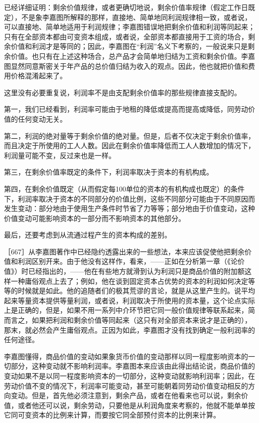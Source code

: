 

已经详细证明：剩余价值规律，或者更确切地说，剩余价值率规律（假定工作日既定），不是象李嘉图所解释的那样，直接地、简单地同利润规律相一致，或者说，可以直接地、简单地适用于利润规律；李嘉图错误地把剩余价值和利润等同起来；只有在全部资本都由可变资本组成，或者说，全部资本都直接用于工资的场合，剩余价值和利润才是等同的；因此，李嘉图在“利润”名义下考察的，一般说来只是剩余价值。也只有在上述这种场合，总产品才会简单地归结为工资和剩余价值。李嘉图显然同意斯密关于年产品的总价值归结为收入的观点。因此，他也就把价值和费用价格混淆起来了。

这里没有必要重复说，利润率不是由支配剩余价值率的那些规律直接支配的。

第一，我们已经看到，利润率可能由于地租的降低或提高而提高或降低，同劳动价值的任何变动无关。

第二，利润的绝对量等于剩余价值的绝对量。但是，后者不仅决定于剩余价值率，而且决定于所使用的工人人数。因此在剩余价值率降低而工人人数增加的情况下，利润量可能不变，反过来也是一样。

第三，在剩余价值率既定的条件下，利润率取决于资本的有机构成。

第四，在剩余价值既定（从而假定每100单位的资本的有机构成也既定）的条件下，利润率取决于资本的不同部分的价值比例，这些不同部分可能由于不同原因而发生变动：部分地由于使用生产条件时节省了力等等；部分地由于价值变动，这种价值变动可能影响资本的一部分而不影响资本的其他部分。

最后，还要考虑到从流通过程产生的资本构成的差别。

［667］从李嘉图著作中已经隐约透露出来的一些想法，本来应该促使他把剩余价值和利润区别开来。由于他没有这样作，看来，——正如在分析第一章（《论价值》）时已经指出的，——他在有些地方就滑到认为利润只是商品价值的附加额这样一种庸俗观点上去了；例如，他在谈到固定资本占优势的资本的利润如何决定等等的时候就是如此。他的追随者们的极其荒谬的言论，就是从这里产生的。说平均起来等量资本提供等量利润，或者说，利润取决于所使用的资本量，这个论点实际上是正确的，但是，如果不用一系列中介环节把它同一般价值规律等联系起来，简而言之，如果把利润和剩余价值等同起来（这只有对全部资本来说才是正确的），那末，就必然会产生庸俗观点。正因为如此，李嘉图才没有找到确定一般利润率的任何途径。

李嘉图懂得，商品价值的变动如果象货币价值的变动那样以同一程度影响资本的一切部分，这种变动就不影响利润率。李嘉图本来应该由此得出结论说，商品价值的变动如果不是以同一程度影响资本的一切部分，这种变动就影响利润率；因此，在劳动价值不变的情况下，利润率可能变动，甚至可能朝着同劳动价值变动相反的方向变动。但是，首先他必须注意到，剩余产品，或者在他看来也可以说，剩余价值，或者他还可以说，剩余劳动，只要他是从利润角度来考察的，他就不能单单按它同可变资本的比例来计算，而要按它同全部预付资本的比例来计算。

